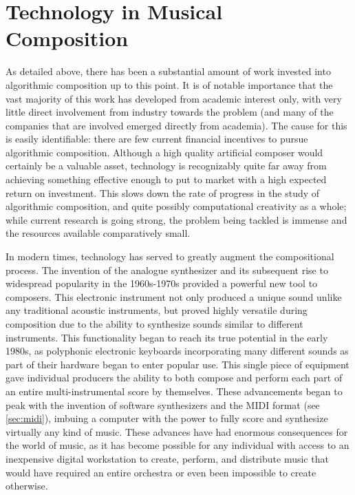 \documentclass[ author={Stephen Livermore-Tozer},
				supervisor={Dr. Peter Flach},
				degree={MEng},
				title={Algorithmic Co-composition Using Machine Learning},
				subtitle={},
				type={research},
				year={2016} ]{dissertation}
\begin{document}
	\section{Technology in Musical Composition}
	\label{sec:tech-in-music}
	
	As detailed above, there has been a substantial amount of work invested into algorithmic composition up to this point. It is of notable importance that the vast majority of this work has developed from academic interest only, with very little direct involvement from industry towards the problem (and many of the companies that are involved emerged directly from academia). The cause for this is easily identifiable: there are few current financial incentives to pursue algorithmic composition. Although a high quality artificial composer would certainly be a valuable asset, technology is recognizably quite far away from achieving something effective enough to put to market with a high expected return on investment. This slows down the rate of progress in the study of algorithmic composition, and quite possibly computational creativity as a whole; while current research is going strong, the problem being tackled is immense and the resources available comparatively small. 
	
	In modern times, technology has served to greatly augment the compositional process. The invention of the 
	analogue synthesizer and its subsequent rise to widespread popularity in the 1960s-1970s provided a powerful new tool to composers. This electronic instrument not only produced a unique sound unlike any traditional acoustic instruments, but proved highly versatile during composition due to the ability to synthesize sounds similar to different instruments. This functionality began to reach its true potential in the early 1980s, as polyphonic electronic keyboards incorporating many different sounds as part of their hardware began to enter popular use. This single piece of equipment gave individual producers the ability to both compose and perform each part of an entire multi-instrumental score by themselves. These advancements began to peak with the invention of software synthesizers and the MIDI format (see \ref{sec:midi}), imbuing a computer with the power to fully score and synthesize virtually any kind of music. These advances have had enormous consequences for the world of music, as it has become possible for any individual with access to an inexpensive digital workstation to create, perform, and distribute music that would have required an entire orchestra or even been impossible to create otherwise.
	
\end{document}
